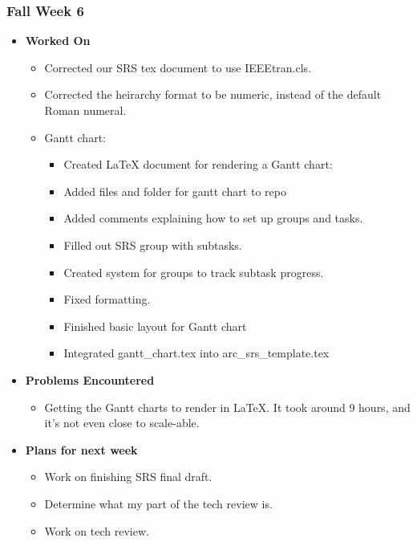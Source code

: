 \documentclass[compsoc,draftclsnofoot,onecolumn,10pt]{IEEEtran}
\begin{document}
\subsubsection{Fall Week 6}
\begin{itemize}
    \item {\textbf{Worked On}}
    \begin{itemize}
        \item Corrected our SRS tex document to use IEEEtran.cls.
        \item Corrected the heirarchy format to be numeric, instead of the default Roman numeral.
        \item Gantt chart:
        \begin{itemize}
            \item Created LaTeX document for rendering a Gantt chart:
            \item Added files and folder for gantt chart to repo
            \item Added comments explaining how to set up groups and tasks.
            \item Filled out SRS group with subtasks.
            \item Created system for groups to track subtask progress.
            \item Fixed formatting.
            \item Finished basic layout for Gantt chart
            \item Integrated gantt\_chart.tex into arc\_srs\_template.tex
        \end{itemize}
    \end{itemize}

    \item {\textbf{Problems Encountered}}
    \begin{itemize}
        \item Getting the Gantt charts to render in LaTeX. It took around 9 hours, and it's not even close to scale-able.
    \end{itemize}

    \item{\textbf{Plans for next week}}
    \begin{itemize}
        \item Work on finishing SRS final draft.
        \item Determine what my part of the tech review is.
        \item Work on tech review.
    \end{itemize}
\end{itemize}
\end{document}
